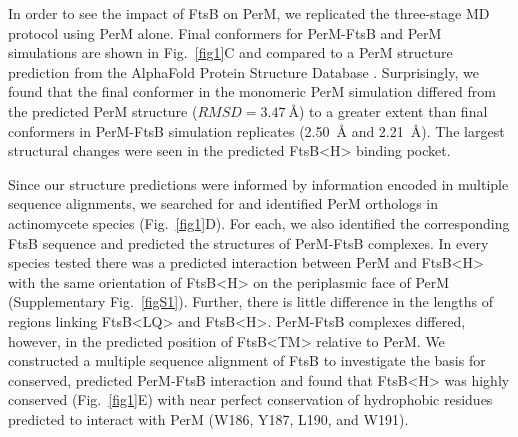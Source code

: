 \documentclass[pdflatex,sn-nature]{sn-jnl}%
\def\textsuperscript#1{<#1>}%
\newcommand\ftsbTM{FtsB\textsuperscript{TM}}
\newcommand\ftsbLQ{FtsB\textsuperscript{LQ}}
\newcommand\ftsbH{FtsB\textsuperscript{H}}
\begin{document}
In order to see the impact of FtsB on PerM, we replicated the three-stage MD protocol using PerM alone.
Final conformers for PerM-FtsB and PerM simulations are shown in Fig.~\ref{fig1}C and compared to a PerM structure prediction from the AlphaFold Protein Structure Database \citep{varadiAlphaFoldProteinStructure2022}.
Surprisingly, we found that the final conformer in the monomeric PerM simulation differed from the predicted PerM structure ($RMSD=\qty{3.47}{\angstrom}$) to a greater extent than final conformers in PerM-FtsB simulation replicates (\qty{2.50}{\angstrom} and \qty{2.21}{\angstrom}).
The largest structural changes were seen in the predicted \ftsbH{} binding pocket.

Since our structure predictions were informed by information encoded in multiple sequence alignments, we searched for and identified PerM orthologs in actinomycete species (Fig.~\ref{fig1}D).
For each, we also identified the corresponding FtsB sequence and predicted the structures of PerM-FtsB complexes.
In every species tested there was a predicted interaction between PerM and \ftsbH{} with the same orientation of \ftsbH{} on the periplasmic face of PerM (Supplementary Fig.~\ref{figS1}).
Further, there is little difference in the lengths of regions linking \ftsbLQ{} and \ftsbH{}.
PerM-FtsB complexes differed, however, in the predicted position of \ftsbTM{} relative to PerM.
We constructed a multiple sequence alignment of FtsB to investigate the basis for conserved, predicted PerM-FtsB interaction and found that \ftsbH{} was highly conserved (Fig.~\ref{fig1}E) with near perfect conservation of hydrophobic residues predicted to interact with PerM (W186, Y187, L190, and W191).
\end{document}
